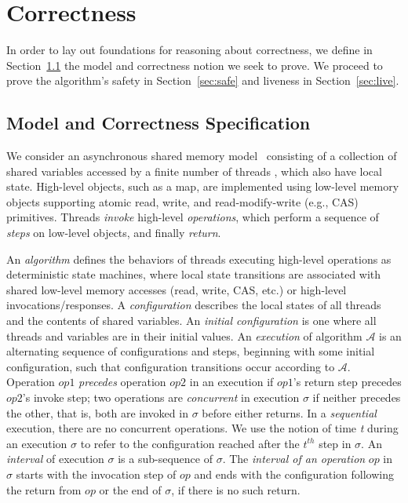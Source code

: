 \newcommand{\lp}[1]{LP(\ensuremath{#1})}

\section{Correctness}
\label{sec:proof}

In order to lay out foundations  for reasoning about correctness,  we  define in Section~\ref{sec:spec} the model and correctness notion we seek to prove. 
We proceed to prove the algorithm's safety in Section~\ref{sec:safe} and liveness in Section~\ref{sec:live}.

\subsection{Model and Correctness Specification}
\label{sec:spec}

We consider an asynchronous shared memory model~\cite{Welch2004} consisting of a collection of shared variables accessed by a finite number of threads , which also have local state.
High-level objects, such as a map, are implemented using low-level memory objects supporting atomic read, write, and read-modify-write (e.g., CAS) primitives. 
Threads  \emph{invoke} high-level \emph{operations}, which perform a sequence of  \emph{steps} on low-level objects, and finally \emph{return}.

An \emph{algorithm} defines the behaviors of threads executing high-level operations as deterministic state machines, where local state transitions are associated with  shared low-level memory 
accesses (read, write, CAS, etc.) or high-level invocations/responses.
A \emph{configuration} describes the  local states of all threads and the contents of shared variables. An \emph{initial configuration} is one where all threads and variables  are in their initial values.
An \emph{execution} of algorithm $\mathcal{A}$ is an alternating sequence of configurations and steps, beginning with some initial configuration, 
such that configuration transitions occur according to $\mathcal{A}$.
Operation $op1$ \emph{precedes} operation $op2$ in an execution if $op1$'s return step precedes $op2$'s invoke step;
two operations are \emph{concurrent} in execution $\sigma$  if neither precedes the other, that is, both are invoked in $\sigma$  before either returns.
 In a  \emph{sequential} execution, there are no concurrent operations.
We use the notion of time \emph{t} during an execution $\sigma$  to refer to the configuration reached after the $t^{th}$ step in $\sigma$.
An \emph{interval} of execution $\sigma$ is a sub-sequence of $\sigma$.
The \emph{interval of an operation} $op$ in $\sigma$  starts with the invocation step of $op$ and ends with the configuration following the return from $op$ or 
the end of $\sigma$, if there is no such return.

